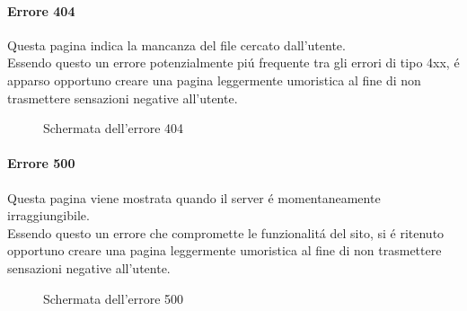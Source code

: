 \documentclass[]{article}
\begin{document}
\paragraph*{Errore 404}
Questa pagina indica la mancanza del file cercato dall'utente.\\
Essendo questo un errore potenzialmente piú frequente tra gli errori di tipo 4xx, é apparso opportuno creare una pagina leggermente umoristica al fine di non trasmettere sensazioni negative all'utente.
\begin{figure}[H]
	\centering
	\caption{Schermata dell'errore 404}
\end{figure}
\paragraph*{Errore 500}
Questa pagina viene mostrata quando il server é momentaneamente irraggiungibile.\\
Essendo questo un errore che compromette le funzionalitá del sito, si é ritenuto opportuno creare una pagina leggermente umoristica al fine di non trasmettere sensazioni negative all'utente.
\begin{figure}[H]
	\centering
	\caption{Schermata dell'errore 500}
\end{figure}
\end{document}
